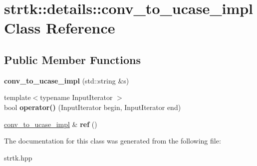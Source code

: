 \hypertarget{classstrtk_1_1details_1_1conv__to__ucase__impl}{\section{strtk\-:\-:details\-:\-:conv\-\_\-to\-\_\-ucase\-\_\-impl Class Reference}
\label{classstrtk_1_1details_1_1conv__to__ucase__impl}
}
\subsection*{Public Member Functions}
\begin{DoxyCompactItemize}
\item 
\hypertarget{classstrtk_1_1details_1_1conv__to__ucase__impl_a33279e829f6cc07c6c47825eb2661050}{{\bfseries conv\-\_\-to\-\_\-ucase\-\_\-impl} (std\-::string \&s)}\label{classstrtk_1_1details_1_1conv__to__ucase__impl_a33279e829f6cc07c6c47825eb2661050}

\item 
\hypertarget{classstrtk_1_1details_1_1conv__to__ucase__impl_aa2d6ddb5ace785712ee834fd2a969ef1}{{\footnotesize template$<$typename Input\-Iterator $>$ }\\bool {\bfseries operator()} (Input\-Iterator begin, Input\-Iterator end)}\label{classstrtk_1_1details_1_1conv__to__ucase__impl_aa2d6ddb5ace785712ee834fd2a969ef1}

\item 
\hypertarget{classstrtk_1_1details_1_1conv__to__ucase__impl_a3407261858895ffc4ab2f72ad2c909b5}{\hyperlink{classstrtk_1_1details_1_1conv__to__ucase__impl}{conv\-\_\-to\-\_\-ucase\-\_\-impl} \& {\bfseries ref} ()}\label{classstrtk_1_1details_1_1conv__to__ucase__impl_a3407261858895ffc4ab2f72ad2c909b5}

\end{DoxyCompactItemize}


The documentation for this class was generated from the following file\-:\begin{DoxyCompactItemize}
\item 
strtk.\-hpp\end{DoxyCompactItemize}
